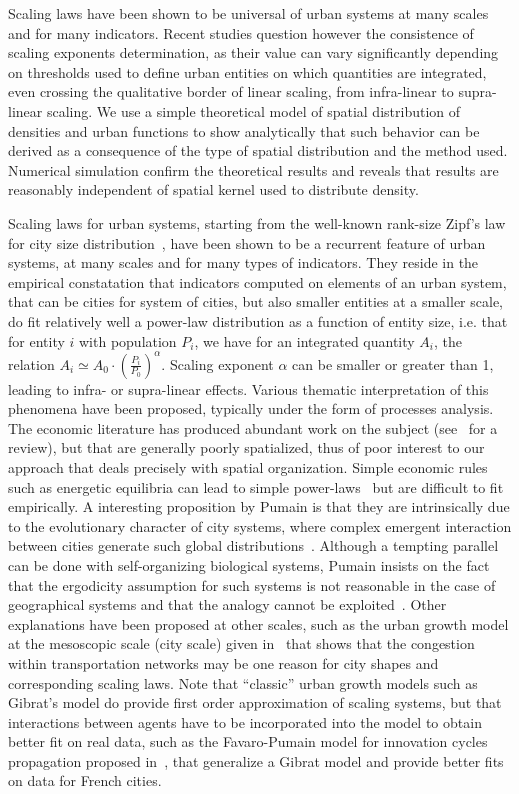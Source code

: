 Scaling laws have been shown to be universal of urban systems at many scales and for many indicators. Recent studies question however the consistence of scaling exponents determination, as their value can vary significantly depending on thresholds used to define urban entities on which quantities are integrated, even crossing the qualitative border of linear scaling, from infra-linear to supra-linear scaling. We use a simple theoretical model of spatial distribution of densities and urban functions to show analytically that such behavior can be derived as a consequence of the type of spatial distribution and the method used. Numerical simulation confirm the theoretical results and reveals that results are reasonably independent of spatial kernel used to distribute density.



Scaling laws for urban systems, starting from the well-known rank-size Zipf's law for city size distribution~\cite{gabaix1999zipf}, have been shown to be a recurrent feature of urban systems, at many scales and for many types of indicators. They reside in the empirical constatation that indicators computed on elements of an urban system, that can be cities for system of cities, but also smaller entities at a smaller scale, do fit relatively well a power-law distribution as a function of entity size, i.e. that for entity $i$ with population $P_i$, we have for an integrated quantity $A_i$, the relation $A_i \simeq A_0\cdot \left(\frac{P_i}{P_0}\right)^{\alpha}$. Scaling exponent $\alpha$ can be smaller or greater than 1, leading to infra- or supra-linear effects. Various thematic interpretation of this phenomena have been proposed, typically under the form of processes analysis. The economic literature has produced abundant work on the subject (see~\cite{Gabaix20042341} for a review), but that are generally poorly spatialized, thus of poor interest to our approach that deals precisely with spatial organization. Simple economic rules such as energetic equilibria can lead to simple power-laws~\cite{bettencourt2008large} but are difficult to fit empirically. A interesting proposition by Pumain is that they are intrinsically due to the evolutionary character of city systems, where complex emergent interaction between cities generate such global distributions~\cite{pumain2006evolutionary}. Although a tempting parallel can be done with self-organizing biological systems, Pumain insists on the fact that the ergodicity assumption for such systems is not reasonable in the case of geographical systems and that the analogy cannot be exploited~\cite{pumain2012urban}. Other explanations have been proposed at other scales, such as the urban growth model at the mesoscopic scale (city scale) given in~\cite{2014arXiv1401.8200L} that shows that the congestion within transportation networks may be one reason for city shapes and corresponding scaling laws. Note that ``classic'' urban growth models such as Gibrat's model do provide first order approximation of scaling systems, but that interactions between agents have to be incorporated into the model to obtain better fit on real data, such as the Favaro-Pumain model for innovation cycles propagation proposed in~\cite{favaro2011gibrat}, that generalize a Gibrat model and provide better fits on data for French cities.

